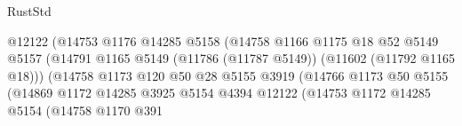 \begin{lexlean}{RustStd}
\begin{coremodule}
                                                @12122
                                                (@14753
                                                  @1176
                                                  @14285
                                                  @5158
                                                  (@14758
                                                    @1166
                                                    @1175
                                                    @18
                                                    @52
                                                    @5149
                                                    @5157
                                                    (@14791
                                                      @1165
                                                      @5149
                                                      (@11786 (@11787 @5149))
                                                      (@11602 (@11792 @1165 @18)))
                                                    (@14758
                                                      @1173
                                                      @120
                                                      @50
                                                      @28
                                                      @5155
                                                      @3919
                                                      (@14766
                                                        @1173
                                                        @50
                                                        @5155
                                                        (@14869
                                                          @1172
                                                          @14285
                                                          @3925
                                                          @5154
                                                          @4394
                                                          @12122
                                                          (@14753
                                                            @1172
                                                            @14285
                                                            @5154
                                                            (@14758
                                                              @1170
                                                              @391

\end{coremodule}
\end{lexlean}
